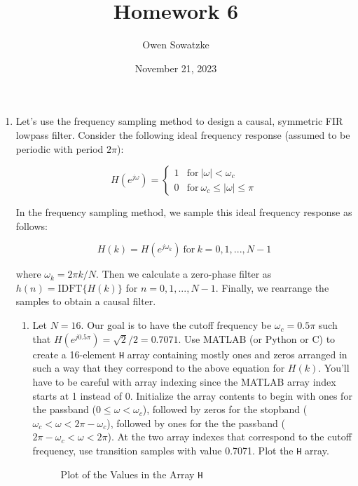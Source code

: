 \documentclass[fleqn]{article}
\title{Homework 6}
\author{Owen Sowatzke}
\date{November 21, 2023}
\makeatletter
\newcommand{\zerodisplayskip}{
	\setlength{\abovedisplayskip}{0pt}%
	\setlength{\belowdisplayskip}{0pt}%
	\setlength{\abovedisplayshortskip}{0pt}%
	\setlength{\belowdisplayshortskip}{0pt}%
	\setlength{\mathindent}{0pt}}
\newenvironment{equationCenter}{\@fleqnfalse\begin{equation*}}{\end{equation*}}
\makeatother
\begin{document}
	\offinterlineskip
	\setlength{\lineskip}{12pt}
	\zerodisplayskip
	\maketitle
	\begin{enumerate}
		\item Let's use the frequency sampling method to design a causal, symmetric FIR lowpass filter. Consider the following ideal frequency response (assumed to be periodic with period $2\pi$):
		
		\begin{equationCenter}
			H(e^{j\omega}) = \begin{cases}
				1 & \text{for}\ |\omega| < \omega_c\\
				0 & \text{for}\ \omega_c \leq |\omega| \leq \pi
			\end{cases}
		\end{equationCenter}
		
		In the frequency sampling method, we sample this ideal frequency response as follows:
		
		\begin{equationCenter}
			H(k) = H(e^{j\omega_k})\ \text{for}\ k = 0,1,...,N-1
		\end{equationCenter}
		
		where $\omega_k = 2{\pi}k/N$. Then we calculate a zero-phase filter as $h(n) = \text{IDFT}\{H(k)\}$ for $n = 0,1,...,N-1$. Finally, we rearrange the samples to obtain a causal filter.
		
		\begin{enumerate}[nolistsep]
			\item Let $N = 16$. Our goal is to have the cutoff frequency be $\omega_c = 0.5\pi$ such that $H(e^{j0.5\pi}) = \sqrt{2}/2 = 0.7071$. Use MATLAB (or Python or C) to create a 16-element \texttt{H} array containing mostly ones and zeros arranged in such a way that they correspond to the above equation for $H(k)$. You'll have to be careful with array indexing since the MATLAB array index starts at 1 instead of 0. Initialize the array contents to begin with ones for the passband ($0 \leq \omega < \omega_c$), followed by zeros for the stopband ($\omega_c < \omega < 2\pi - \omega_c$), followed by ones for the the passband ($2\pi - \omega_c < \omega < 2\pi$). At the two array indexes that correspond to the cutoff frequency, use transition samples with value 0.7071. Plot the \texttt{H} array.
			
			\begin{figure}[H]
				\centerline{}
				\caption{Plot of the Values in the Array \texttt{H}}
			\end{figure}
			

\end{enumerate}
\end{enumerate}
\end{document}
